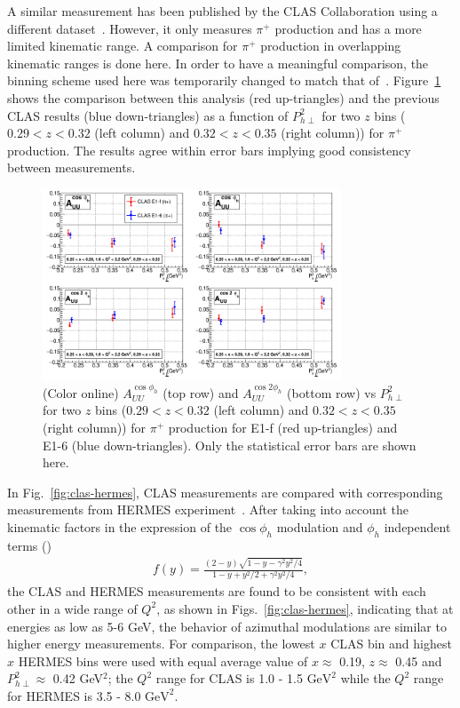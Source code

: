 \documentclass[aps,prl,twocolumn,showpacs,superscriptaddress,groupedaddress]{revtex4-1}  %
\newcommand{\Phperp}{P_{h\perp}}
\newcommand{\xbj}{x}
\begin{document}
A similar measurement has been published by the CLAS Collaboration using a different dataset~\cite{Osipenko:2008rv}.
However, it only measures $\pi^+$ production and has a more limited kinematic range.
A comparison for $\pi^+$ production in overlapping kinematic ranges is done here.
In order to have a meaningful comparison, the binning scheme used here was temporarily changed to match that of~\cite{Osipenko:2008rv}.
Figure~\ref{fig:osipenkoComparisonVPT2_2zBins} shows the comparison between this analysis (red up-triangles) and the previous CLAS results (blue down-triangles) as a function of $\Phperp^2$ for two $z$ bins ($0.29 < z < 0.32$ (left column) and $0.32 < z < 0.35$ (right column)) for $\pi^+$ production.
The results agree within error bars implying good consistency between measurements.
%
\begin{figure}[htp]
\centering
\includegraphics[width=3.5in]{plots/osipenkoComparisonVPT2_2zBins.png}
\caption{(Color online) $A_{UU}^{\cos \phi_h}$ (top row) and $A_{UU}^{\cos 2\phi_h}$ (bottom row) vs $P_{h\perp}^2$ for two $z$ bins ($0.29 < z < 0.32$ (left column) and $0.32 < z < 0.35$ (right column)) for $\pi^+$ production for E1-f (red up-triangles) and E1-6 (blue down-triangles). Only the statistical error bars are shown here.}
\label{fig:osipenkoComparisonVPT2_2zBins}
\end{figure}

In Fig.~\ref{fig:clas-hermes}, CLAS measurements are compared with corresponding measurements from HERMES experiment~\cite{Airapetian:2012yg}.
After taking into account the kinematic factors in the expression
of the $\cos\phi_h$ modulation and $\phi_h$ independent terms (\cite{Bacchetta:2006tn})
\begin{eqnarray}
f(y) = \frac{(2-y)\sqrt{1-y-\gamma^2y^2/4}}{1-y+y^{2}/2+\gamma^2y^2/4} ,
\label{fy}
\end{eqnarray}
the CLAS and HERMES measurements are found to 
be consistent with each other in a wide range of $Q^2$, as shown in Figs.~\ref{fig:clas-hermes}, indicating that at energies as low as 5-6 GeV, the
behavior of azimuthal modulations are similar to higher energy measurements. 
For comparison, the lowest $\xbj$ CLAS bin and highest $\xbj$ HERMES bins were used with equal average value of $\xbj\approx$ 0.19, $z\approx$ 0.45 and $\Phperp^2 \approx$ 0.42 GeV$^2$;
the $Q^2$ range for CLAS is 1.0 - 1.5 $\text{GeV}^2$ while the $Q^2$ range for HERMES is 3.5 - 8.0 $\text{GeV}^2$.
\end{document}
